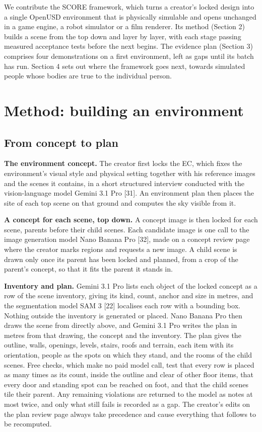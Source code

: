 \documentclass[
  11pt,
]{article}
\begin{document}
We contribute the SCORE framework, which turns a creator's locked design
into a single OpenUSD environment that is physically simulable and opens
unchanged in a game engine, a robot simulator or a film renderer. Its
method (Section 2) builds a scene from the top down and layer by layer,
with each stage passing measured acceptance tests before the next
begins. The evidence plan (Section 3) comprises four demonstrations on a
first environment, left as gaps until its batch has run. Section 4 sets
out where the framework goes next, towards simulated people whose bodies
are true to the individual person.

\section{Method: building an
environment}\label{method-building-an-environment}

\subsection{From concept to plan}\label{from-concept-to-plan}

\textbf{The environment concept.} The creator first locks the EC, which
fixes the environment's visual style and physical setting together with
his reference images and the scenes it contains, in a short structured
interview conducted with the vision-language model Gemini 3.1 Pro
{[}31{]}. An environment plan then places the site of each top scene on
that ground and computes the sky visible from it.

\textbf{A concept for each scene, top down.} A concept image is then
locked for each scene, parents before their child scenes. Each candidate
image is one call to the image generation model Nano Banana Pro
{[}32{]}, made on a concept review page where the creator marks regions
and requests a new image. A child scene is drawn only once its parent
has been locked and planned, from a crop of the parent's concept, so
that it fits the parent it stands in.

\textbf{Inventory and plan.} Gemini 3.1 Pro lists each object of the
locked concept as a row of the scene inventory, giving its kind, count,
anchor and size in metres, and the segmentation model SAM 3 {[}22{]}
localises each row with a bounding box. Nothing outside the inventory is
generated or placed. Nano Banana Pro then draws the scene from directly
above, and Gemini 3.1 Pro writes the plan in metres from that drawing,
the concept and the inventory. The plan gives the outline, walls,
openings, levels, stairs, roofs and terrain, each item with its
orientation, people as the spots on which they stand, and the rooms of
the child scenes. Free checks, which make no paid model call, test that
every row is placed as many times as its count, inside the outline and
clear of other floor items, that every door and standing spot can be
reached on foot, and that the child scenes tile their parent. Any
remaining violations are returned to the model as notes at most twice,
and only what still fails is recorded as a gap. The creator's edits on
the plan review page always take precedence and cause everything that
follows to be recomputed.
\end{document}
